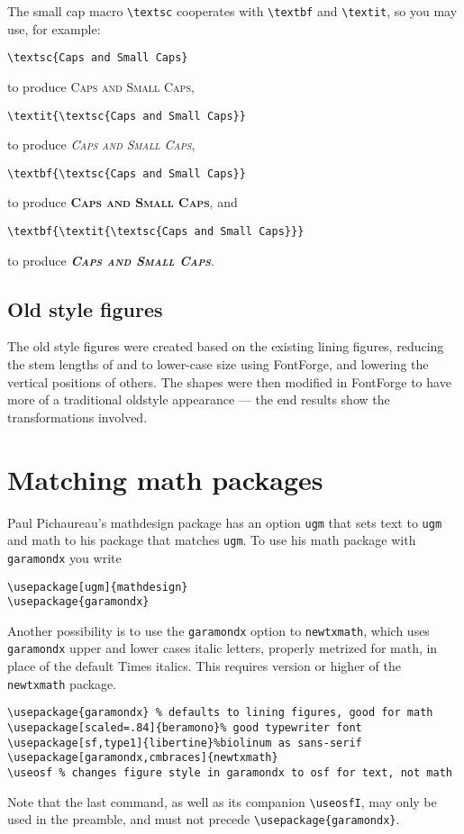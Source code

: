 \documentclass[11pt]{article}
\begin{document}
The small cap macro \verb|\textsc| cooperates with \verb|\textbf| and \verb|\textit|, so you may use, for example:
\begin{verbatim}
\textsc{Caps and Small Caps}
\end{verbatim}
to produce \textsc{Caps and Small Caps},
\begin{verbatim}
\textit{\textsc{Caps and Small Caps}}
\end{verbatim}
to produce \textit{\textsc{Caps and Small Caps}},
\begin{verbatim}
\textbf{\textsc{Caps and Small Caps}}
\end{verbatim}
to produce \textbf{\textsc{Caps and Small Caps}}, and
\begin{verbatim}
\textbf{\textit{\textsc{Caps and Small Caps}}}
\end{verbatim}
to produce \textbf{\textit{\textsc{Caps and Small Caps}}}.

\subsection{Old style figures}
The old style figures were created based on the existing lining figures, reducing the stem lengths of  and  to lower-case size using FontForge, and lowering the vertical positions of others. The shapes were then modified in FontForge to have more of a traditional oldstyle appearance --- the end results  show the transformations involved.

\section{Matching math packages}
Paul Pichaureau's \textsf{mathdesign} package has an option \texttt{ugm} that sets text to \texttt{ugm} and math to his package that matches \texttt{ugm}. To use his math package with \texttt{garamondx} you write
\begin{verbatim}
\usepackage[ugm]{mathdesign}
\usepackage{garamondx}
\end{verbatim}
Another possibility is to use the \texttt{garamondx} option to \texttt{newtxmath}, which uses \texttt{garamondx} upper and lower cases italic letters, properly metrized for math, in place of the default Times italics. This requires version  or higher of the \texttt{newtxmath} package. 
\begin{verbatim}
\usepackage{garamondx} % defaults to lining figures, good for math
\usepackage[scaled=.84]{beramono}% good typewriter font
\usepackage[sf,type1]{libertine}%biolinum as sans-serif
\usepackage[garamondx,cmbraces]{newtxmath}
\useosf % changes figure style in garamondx to osf for text, not math
\end{verbatim}
Note that the last command, as well as its companion \verb|\useosfI|, may only be used in the preamble, and must not precede \verb|\usepackage{garamondx}|.
\end{document}
